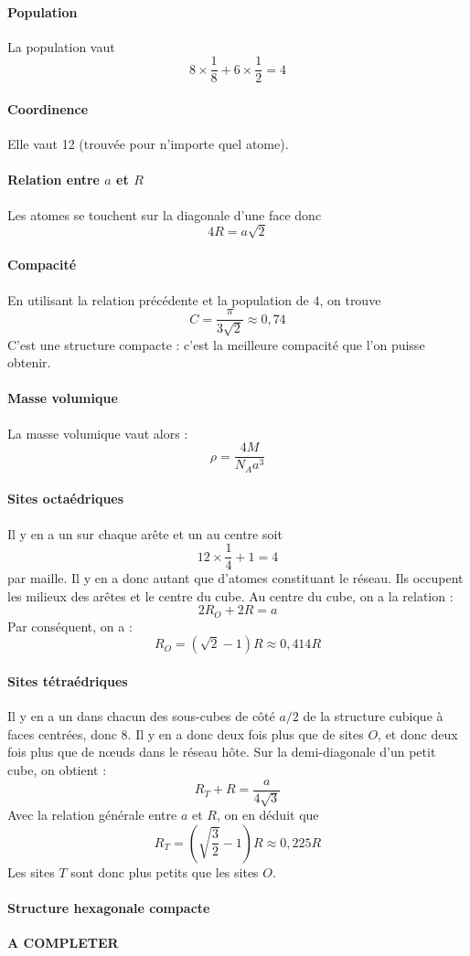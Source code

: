 \documentclass[french]{book}
\theoremstyle{plain}
\theoremstyle{definition}
\theoremstyle{remark}
\begin{document}
\paragraph{Population} La population vaut $$8\times\frac{1}{8}+6\times\frac{1}{2}=4$$
\paragraph{Coordinence} Elle vaut 12 (trouvée pour n'importe quel atome).
\paragraph{Relation entre $a$ et $R$} Les atomes se touchent sur la diagonale d'une face donc $$4R=a\sqrt{2}$$
\paragraph{Compacité} En utilisant la relation précédente et la population de $4$, on trouve $$C=\frac{\pi}{3\sqrt{2}}\approx 0,74$$ C'est une structure compacte : c'est la meilleure compacité que l'on puisse obtenir.
\paragraph{Masse volumique} La masse volumique vaut alors : $$\rho=\frac{4M}{N_Aa^3}$$
\paragraph{Sites octaédriques} Il y en a un sur chaque arête et un au centre soit $$12\times\frac{1}{4}+1=4$$ par maille. Il y en a donc autant que d'atomes constituant le réseau. Ils occupent les milieux des arêtes et le centre du cube. Au centre du cube, on a la relation : $$2R_O+2R=a$$ Par conséquent, on a : $$R_O=(\sqrt{2}-1)R\approx 0,414 R$$
\paragraph{Sites tétraédriques} Il y en a un dans chacun des sous-cubes de côté $a/2$ de la structure cubique à faces centrées, donc $8$. Il y en a donc deux fois plus que de sites $O$, et donc deux fois plus que de nœuds dans le réseau hôte. Sur la demi-diagonale d'un petit cube, on obtient : $$R_T+R=\frac{a}{4\sqrt{3}}$$ Avec la relation générale entre $a$ et $R$, on en déduit que $$R_T=\left(\sqrt{\frac{3}{2}}-1\right)R\approx 0,225R$$ Les sites $T$ sont donc plus petits que les sites $O$.
\paragraph{Structure hexagonale compacte} \textbf{A COMPLETER}
\end{document}
